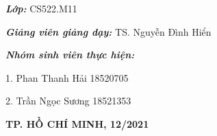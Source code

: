 \begin{titlepage}
	\vspace{1.5cm}
	\justifying \normalsize	
	\hspace{70pt} \textbf{\textit{Lớp:}} CS522.M11
		
	\hspace{70pt} \textbf{\textit{Giảng viên giảng dạy:}} TS. Nguyễn Đình Hiển
			
	\hspace{70pt} \textbf{\textit{Nhóm sinh viên thực hiện:}}
		
	\hspace{70pt} 1. \hspace{10pt} Phan Thanh Hải \hspace{98pt} 18520705
		
	\hspace{70pt} 2. \hspace{10pt} Trần Ngọc Sương \hspace{95pt} 18521353
			
	\vspace{2cm}
		
	\begin{center}
		\textbf{TP. HỒ CHÍ MINH, 12/2021}
    \end{center}

\end{titlepage}